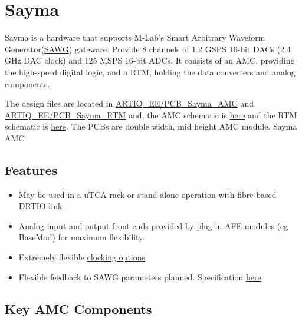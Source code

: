 \section{Sayma}

Sayma is a hardware that supports M-Lab's Smart Arbitrary Waveform Generator(\href{http://m-labs.hk/artiq/manual-master/core_drivers_reference.html?highlight=sawg#module-artiq.coredevice.sawg}{SAWG}) gateware.
Provide 8 channels of
1.2 GSPS 16-bit DACs (2.4 GHz DAC clock) and 125 MSPS 16-bit ADCs. It
consists of an AMC, providing the high-speed digital logic, and a RTM,
holding the data converters and analog components.

The design files are located in
\href{https://github.com/m-labs/sinara/tree/master/ARTIQ_EE/PCB_Sayma_AMC}{ARTIQ\_EE/PCB\_Sayma\_AMC}
and
\href{https://github.com/m-labs/sinara/tree/master/ARTIQ_EE/PCB_Sayma_RTM}{ARTIQ\_EE/PCB\_Sayma\_RTM}
and, the AMC schematic is
\href{https://github.com/m-labs/sinara/blob/master/ARTIQ_EE/Sayma_AMC.pdf}{here}
and the RTM schematic is
\href{https://github.com/m-labs/sinara/blob/master/ARTIQ_EE/Sayma_RTM.pdf}{here}.
The PCBs are double width, mid height AMC module. Sayma AMC

\subsection{Features}\label{features}

\begin{itemize}

\item
  May be used in a uTCA rack or stand-alone operation with fibre-based
  DRTIO link
\item
  Analog input and output front-ends provided by plug-in
  \href{https://github.com/m-labs/sinara/wiki/SaymaAFE}{AFE} modules (eg BaseMod) for maximum
  flexibility.
\item
  Extremely flexible \href{https://github.com/m-labs/sinara/wiki/SinaraClocking}{clocking options}
\item
  Flexible feedback to SAWG parameters planned. Specification
  \href{https://github.com/m-labs/sinara/wiki/Servo}{here}.
\end{itemize}

\subsection{Key AMC Components}\label{key-amc-components}


\noindent

